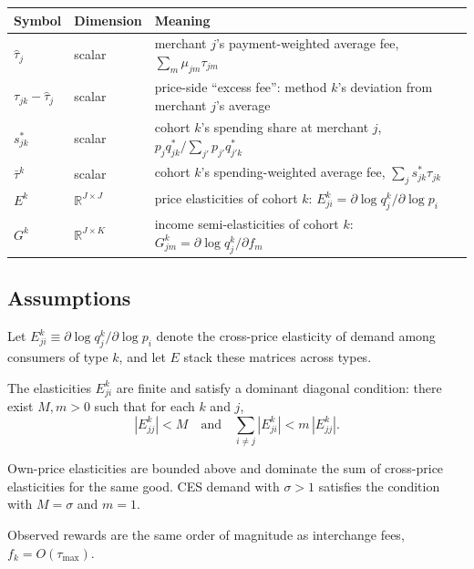 \documentclass[main.tex]{subfiles}
\begin{document}
\begin{center}
\begin{tabular}{lll}
\toprule
\textbf{Symbol} & \textbf{Dimension} & \textbf{Meaning} \\
\midrule
$\hat\tau_j$ & scalar & merchant $j$'s payment-weighted average fee, $\sum_m\mu_{jm}\tau_{jm}$ \\
$\tau_{jk}-\hat\tau_j$ & scalar & price-side ``excess fee'': method $k$'s deviation from merchant $j$'s average \\
$s^*_{jk}$ & scalar & cohort $k$'s spending share at merchant $j$, $p_jq^*_{jk}/\sum_{j'}p_{j'}q^*_{j'k}$ \\
$\bar\tau^k$ & scalar & cohort $k$'s spending-weighted average fee, $\sum_j s^*_{jk}\tau_{jk}$ \\
$E^{k}$ & $\mathbb{R}^{J\times J}$ & price elasticities of cohort $k$: $E^k_{ji}=\partial\log q^k_j/\partial\log p_i$ \\
$G^{k}$ & $\mathbb{R}^{J\times K}$ & income semi-elasticities of cohort $k$: $G^k_{jm}=\partial\log q^k_j/\partial f_m$ \\
\bottomrule
\end{tabular}
\end{center}

\subsection{Assumptions}

Let $E^k_{ji}\equiv\partial\log q^k_j/\partial\log p_i$ denote the cross-price elasticity of demand among consumers of type $k$, and let $E$ stack these matrices across types.

\begin{assumption}\label{assump:dominant-diagonal}
The elasticities $E^k_{ji}$ are finite and satisfy a dominant diagonal condition: there exist $M,m>0$ such that for each $k$ and $j$,
\[
|E^k_{jj}|<M\quad\text{and}\quad\sum_{i\neq j}|E^k_{ji}|<m\,|E^k_{jj}|.
\]
\end{assumption}

Own-price elasticities are bounded above and dominate the sum of cross-price elasticities for the same good.
CES demand with $\sigma>1$ satisfies the condition with $M=\sigma$ and $m=1$.

\begin{assumption}\label{assump:positive-costs}
Observed rewards are the same order of magnitude as interchange fees, $f_k=O(\tau_{\max})$.
\end{assumption}
\end{document}
